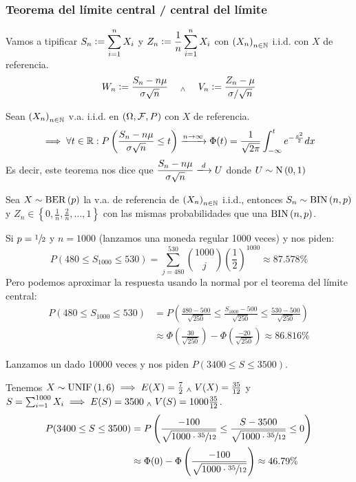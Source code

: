 \subsubsection{Teorema del límite central / central del límite}

Vamos a tipificar $\displaystyle S_n\vcentcolon= \sum_{i=1}^{n} X_i$ y $\displaystyle Z_n \vcentcolon= \frac{1}{n}\sum_{i=1}^{n} X_i$ con $\left(X_n\right)_{n\in \mathbb{N}}$ i.i.d. con $X$ de referencia.
\[W_n \vcentcolon= \frac{S_n - n\mu}{\sigma \sqrt{n}} \quad \; _{\wedge} \; \quad V_n \vcentcolon= \frac{Z_n - \mu}{\sigma/\sqrt{n}}\]

\begin{teo}
	Sean $\left(X_n\right)_{n\in \mathbb{N}}$ v.a. i.i.d. en $(\Omega, \mathcal{F}, P)$ con $X$ de referencia.
	\[\implies \forall t \in \mathbb{R} : P\left(\frac{S_n - n\mu}{\sigma \sqrt{n}} \leq t\right) \xrightarrow{n\to\infty} \Phi(t) = \frac{1}{\sqrt{2\pi}}\int_{-\infty}^{t} e^{-\frac{x^2}{2}}dx\]
	Es decir, este teorema nos dice que $\ds \frac{S_n - n\mu}{\sigma \sqrt{n}} \xlongrightarrow{d} U$ donde $U\sim\operatorname{N}\left(0,1\right)$
\end{teo}

\begin{ejem}
	Sea $X\sim \operatorname{BER}\left(p\right)$ la v.a. de referencia de $\left(X_n\right)_{n\in \mathbb{N}}$ i.i.d., entonces $S_n \sim \operatorname{BIN}\left(n,p\right)$ y $Z_n \in \left\{0, \frac{1}{n}, \frac{2}{n}, \dots, 1\right\}$ con las mismas probabilidades que una $\operatorname{BIN}\left(n,p\right)$.

	Si $p=\sfrac{1}{2}$ y $n=1000$ (lanzamos una moneda regular 1000 veces) y nos piden:
	\[P(480 \leq S_1000 \leq 530) = \sum_{j=480}^{530} \binom{1000}{j} \left(\frac{1}{2}\right)^{1000} \approx 87.578\%\]
	Pero podemos aproximar la respuesta usando la normal por el teorema del límite central:
	\[\begin{aligned}
			P(480 \leq S_1000 \leq 530) & = P\left(\frac{480-500}{\sqrt{250}} \leq \frac{S_{1000}-500}{\sqrt{250}} \leq \frac{530-500}{\sqrt{250}}\right) \\
			                            & \approx \Phi\left(\frac{30}{\sqrt{250}}\right) - \Phi\left(\frac{-20}{\sqrt{250}}\right) \approx 86.816\%
		\end{aligned}\]
\end{ejem}

\begin{ejem}
	Lanzamos un dado 10000 veces y nos piden $P(3400 \leq S \leq 3500)$.

	Tenemos $X\sim \operatorname{UNIF}\left(1,6\right) \implies E(X) = \frac{7}{2} \; _{\wedge} \; V(X) = \frac{35}{12}$ y $S = \sum_{i=1}^{1000} X_i \implies E(S) = 3500 \; _{\wedge} \; V(S) = 1000\frac{35}{12}$.
	\[\begin{aligned}
			P(3400 \leq S \leq 3500) & = P\left(\frac{-100}{\sqrt{1000 \cdot \sfrac{35}{12}}} \leq \frac{S-3500}{\sqrt{1000\cdot \sfrac{35}{12}}} \leq 0\right) \\
			                         & \approx \Phi(0) - \Phi\left(\frac{-100}{\sqrt{1000\cdot \sfrac{35}{12}}}\right) \approx 46.79\%
		\end{aligned}\]
\end{ejem}

